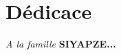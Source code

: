 \chapter*{Dédicace}
\thispagestyle{fancy}
\vspace{5cm}

\begin{flushright}
	\textit{ A la famille} \textbf{SIYAPZE...}
\end{flushright}